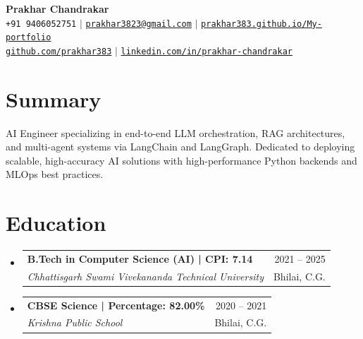 \documentclass[letterpaper,11pt]{article}
\makeatletter
\newcommand{\resumeSubheading}[4]{
  \vspace{-1pt}\item
    \begin{tabular*}{\textwidth}[t]{l@{\extracolsep{\fill}}r}
      \textbf{#1} & {\color{dark-grey}\small #2}\vspace{1pt}\\ 
      \textit{#3} & {\color{dark-grey} \small #4}\\ 
    \end{tabular*}\vspace{-6pt} %
}
\newcommand{\resumeSubHeadingListStart}{\begin{itemize}[leftmargin=0in, label={}]}
\newcommand{\resumeSubHeadingListEnd}{\end{itemize}\vspace{-2pt}}
\makeatother
\begin{document}
\begin{center}
    \textbf{\Huge Prakhar Chandrakar} \\ \vspace{4pt}
    \small \faPhone* \texttt{+91 9406052751} \hspace{2pt} $|$ \hspace{2pt}
    \faEnvelope \hspace{2pt} \href{mailto:prakhar3823@gmail.com}{\texttt{prakhar3823@gmail.com}} \hspace{2pt} $|$ \hspace{2pt}
    \faGlobe \hspace{2pt} \href{https://prakhar383.github.io/My-portfolio/}{\texttt{prakhar383.github.io/My-portfolio}} \\ \vspace{2pt}
    \faGithub \hspace{2pt} \href{https://github.com/prakhar383}{\texttt{github.com/prakhar383}} \hspace{2pt} $|$ \hspace{2pt}
    \faLinkedin \hspace{2pt} \href{https://www.linkedin.com/in/prakhar-chandrakar-2405b93b3/}{\texttt{linkedin.com/in/prakhar-chandrakar}}
    \\ \vspace{-4pt}
\end{center} 

\section{Summary}
\vspace{1pt}
\small{AI Engineer specializing in end-to-end LLM orchestration, RAG architectures, and multi-agent systems via LangChain and LangGraph. Dedicated to deploying scalable, high-accuracy AI solutions with high-performance Python backends and MLOps best practices.}
\vspace{2pt}

\section{Education}
  \resumeSubHeadingListStart
    \resumeSubheading
      {B.Tech in Computer Science (AI) | CPI: 7.14}{2021 -- 2025}
      {Chhattisgarh Swami Vivekananda Technical University}{Bhilai, C.G.}
    \resumeSubheading
      {CBSE Science | Percentage: 82.00\%}{2020 -- 2021}
      {Krishna Public School}{Bhilai, C.G.}
  \resumeSubHeadingListEnd
\end{document}

